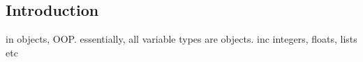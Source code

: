 
\subsection{Introduction}


in objects, OOP. essentially, all variable types are objects. inc integers, floats, lists etc

